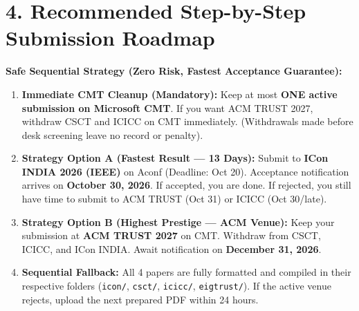 \documentclass[10pt,a4paper]{article}
\begin{document}
\vspace{5pt}
\section*{\normalsize \color{darkgreen}4. Recommended Step-by-Step Submission Roadmap}
\vspace{-6pt}
\noindent
\colorbox{infobg}{%
\parbox{0.985\textwidth}{%
\small
\textbf{\color{darkgreen}Safe Sequential Strategy (Zero Risk, Fastest Acceptance Guarantee):}
\begin{enumerate}[leftmargin=14pt, itemsep=2pt, topsep=2pt]
\item \textbf{Immediate CMT Cleanup (Mandatory):} Keep at most \textbf{ONE active submission on Microsoft CMT}. If you want ACM TRUST 2027, withdraw CSCT and ICICC on CMT immediately. (Withdrawals made before desk screening leave no record or penalty).
\item \textbf{Strategy Option A (Fastest Result --- 13 Days):} Submit to \textbf{ICon INDIA 2026 (IEEE)} on Aconf (Deadline: Oct 20). Acceptance notification arrives on \textbf{October 30, 2026}. If accepted, you are done. If rejected, you still have time to submit to ACM TRUST (Oct 31) or ICICC (Oct 30/late).
\item \textbf{Strategy Option B (Highest Prestige --- ACM Venue):} Keep your submission at \textbf{ACM TRUST 2027} on CMT. Withdraw from CSCT, ICICC, and ICon INDIA. Await notification on \textbf{December 31, 2026}.
\item \textbf{Sequential Fallback:} All 4 papers are fully formatted and compiled in their respective folders (\texttt{icon/}, \texttt{csct/}, \texttt{icicc/}, \texttt{eigtrust/}). If the active venue rejects, upload the next prepared PDF within 24 hours.
\end{enumerate}
}%
}
\end{document}
